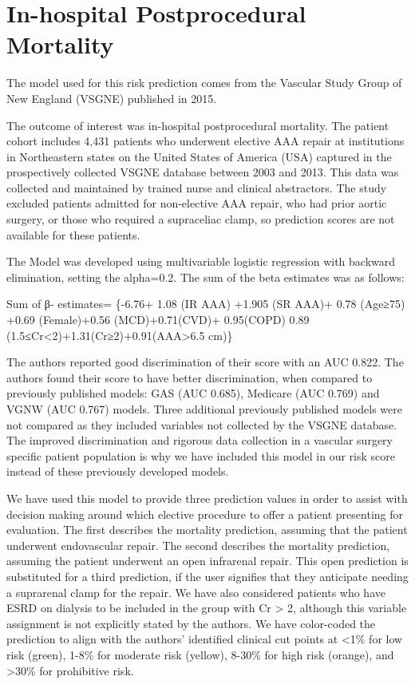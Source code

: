 \documentclass[
]{book}
\begin{document}
\hypertarget{in-hospital-postprocedural-mortality}{%
\section{In-hospital Postprocedural Mortality}\label{in-hospital-postprocedural-mortality}}

The model used for this risk prediction comes from the Vascular Study Group of New England (VSGNE) published in 2015. \citet{eslami2015}

The outcome of interest was in-hospital postprocedural mortality. The patient cohort includes 4,431 patients who underwent elective AAA repair at institutions in Northeastern states on the United States of America (USA) captured in the prospectively collected VSGNE database between 2003 and 2013. This data was collected and maintained by trained nurse and clinical abstractors. The study excluded patients admitted for non-elective AAA repair, who had prior aortic surgery, or those who required a supraceliac clamp, so prediction scores are not available for these patients.

The Model was developed using multivariable logistic regression with backward elimination, setting the alpha=0.2. The sum of the beta estimates was as follows:

Sum of β- estimates= \{-6.76+ 1.08 (IR AAA) +1.905 (SR AAA)+ 0.78 (Age≥75) +0.69 (Female)+0.56 (MCD)+0.71(CVD)+ 0.95(COPD) 0.89 (1.5≤Cr\textless2)+1.31(Cr≥2)+0.91(AAA\textgreater6.5 cm)\}

The authors reported good discrimination of their score with an AUC 0.822. The authors found their score to have better discrimination, when compared to previously published models: GAS (AUC 0.685), Medicare (AUC 0.769) and VGNW (AUC 0.767) models. Three additional previously published models were not compared as they included variables not collected by the VSGNE database. The improved discrimination and rigorous data collection in a vascular surgery specific patient population is why we have included this model in our risk score instead of these previously developed models.

We have used this model to provide three prediction values in order to assist with decision making around which elective procedure to offer a patient presenting for evaluation. The first describes the mortality prediction, assuming that the patient underwent endovascular repair. The second describes the mortality prediction, assuming the patient underwent an open infrarenal repair. This open prediction is substituted for a third prediction, if the user signifies that they anticipate needing a suprarenal clamp for the repair. We have also considered patients who have ESRD on dialysis to be included in the group with Cr \textgreater{} 2, although this variable assignment is not explicitly stated by the authors. We have color-coded the prediction to align with the authors' identified clinical cut points at \textless1\% for low risk (green), 1-8\% for moderate risk (yellow), 8-30\% for high risk (orange), and \textgreater30\% for prohibitive risk.
\end{document}
